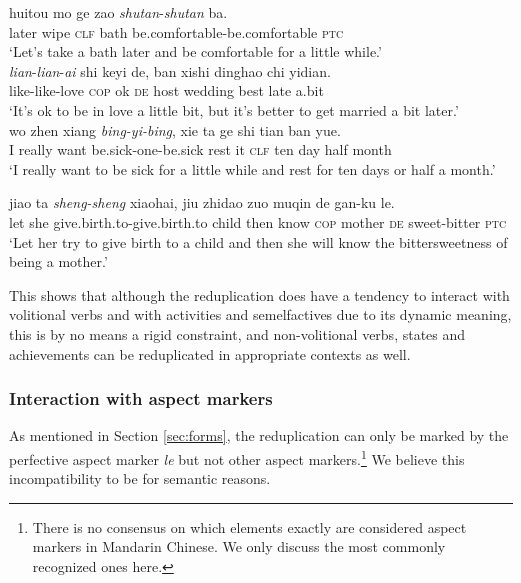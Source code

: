 \ex\label{ex:redup-achi-stat2}
\gll huitou mo ge zao \textit{shutan}-\textit{shutan} ba.\footnotemark\\
later wipe \textsc{clf} bath be.comfortable-be.comfortable \textsc{ptc}\\
\glt `Let's take a bath later and be comfortable for a little while.'\\

\ex\label{ex:redup-achi-stat3}
\gll \textit{lian}-\textit{lian}-\textit{ai} shi keyi de, ban xishi dinghao chi yidian.\footnotemark\\
like-like-love \textsc{cop} ok \textsc{de} host wedding best late a.bit\\
\glt `It's ok to be in love a little bit, but it's better to get married a bit later.'\\

\ex\label{ex:redup-achi-stat4}
\gll wo zhen xiang \textit{bing-yi-bing}, xie ta ge shi tian ban yue.\\
I really want be.sick-one-be.sick rest it \textsc{clf} ten day half month\\ 
\glt `I really want to be sick for a little while and rest for ten days or half a month.'

\ex\label{ex:redup-achi-stat5}
\gll jiao ta \textit{sheng-sheng} xiaohai, jiu zhidao zuo muqin de gan-ku le.\\
let she give.birth.to-give.birth.to child then know \textsc{cop} mother \textsc{de} sweet-bitter \textsc{ptc}\\ 
\glt `Let her try to give birth to a child and then she will know the bittersweetness of being a mother.'
\z
\z


This shows that although the reduplication does have a tendency to interact with volitional verbs and with activities and semelfactives due to its dynamic meaning, 
this is by no means a rigid constraint, 
and non\hyp{}volitional verbs, states and achievements can be reduplicated in appropriate contexts as well.




\subsubsection{Interaction with aspect markers}\label{sec:aspM}

As mentioned in Section \ref{sec:forms}, the reduplication can only be marked by the perfective aspect marker \textit{le} but not other aspect markers.\footnote{
There is no consensus on which elements exactly are considered aspect markers in Mandarin Chinese. We only discuss the most commonly recognized ones here.
}
We believe this incompatibility to be for semantic reasons.

